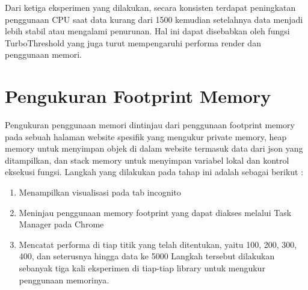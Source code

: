 Dari ketiga eksperimen yang dilakukan, secara konsisten terdapat peningkatan penggunaan CPU saat data kurang dari 1500 kemudian setelahnya data menjadi lebih stabil atau mengalami penurunan. Hal ini dapat disebabkan oleh fungsi TurboThreshold yang juga turut mempengaruhi performa render dan penggunaan memori. 


\section{Pengukuran Footprint Memory}
Pengukuran penggunaan memori dintinjau dari penggunaan footprint memory pada sebuah halaman website spesifik yang mengukur private memory, heap memory untuk menyimpan objek di dalam website termasuk data dari json yang ditampilkan, dan stack memory untuk menyimpan variabel lokal dan kontrol eksekusi fungsi. Langkah yang dilakukan pada tahap ini adalah sebagai berikut :

\begin{enumerate}
\item Menampilkan visualisasi pada tab incognito 
\item Meninjau penggunaan memory footprint yang dapat diakses melalui Task Manager pada Chrome
\item Mencatat performa di tiap titik yang telah ditentukan, yaitu 100, 200, 300, 400, dan seterusnya hingga data ke 5000
Langkah tersebut dilakukan sebanyak tiga kali eksperimen di tiap-tiap library untuk mengukur penggunaan memorinya.  
\end{enumerate} 
